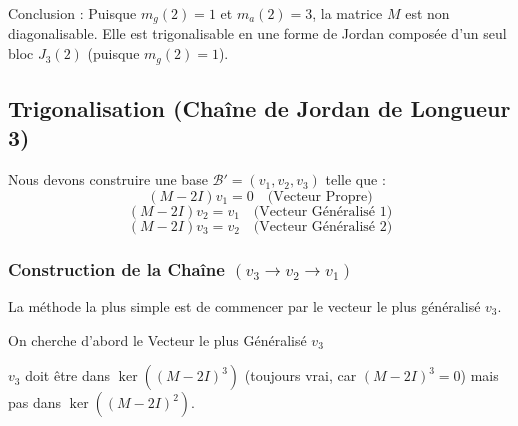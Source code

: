 \documentclass[french]{yLectureNote}
\begin{document}
Conclusion : Puisque $m_g(2) = 1$ et $m_a(2) = 3$, la matrice $M$ est non diagonalisable. Elle est trigonalisable en une forme de Jordan composée d'un seul bloc $J_3(2)$ (puisque $m_g(2)=1$).
\subsection{Trigonalisation (Chaîne de Jordan de Longueur 3)}

Nous devons construire une base $\mathcal{B}' = (v_1, v_2, v_3)$ telle que :
$$(M - 2I) v_1 = 0 \quad \text{(Vecteur Propre)}$$
$$(M - 2I) v_2 = v_1 \quad \text{(Vecteur Généralisé 1)}$$
$$(M - 2I) v_3 = v_2 \quad \text{(Vecteur Généralisé 2)}$$

\subsubsection{Construction de la Chaîne $(v_3 \to v_2 \to v_1)$}

La méthode la plus simple est de commencer par le vecteur le plus généralisé $v_3$.

On cherche d'abord le Vecteur le plus Généralisé $v_3$

$v_3$ doit être dans $\ker((M - 2I)^3)$ (toujours vrai, car $(M - 2I)^3 = 0$) mais pas dans $\ker((M - 2I)^2)$.
\end{document}
